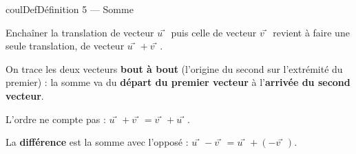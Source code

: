 \documentclass[11pt,a4paper]{article}
\makeatletter
\newcounter{lycee@signet}
\newcommand{\signet}[3][]{\stepcounter{lycee@signet}%
  \edef\lycee@dest{\if\relax\detokenize{#1}\relax
    signet.\arabic{lycee@signet}\else#1\fi}%
  \hypertarget{\lycee@dest}{}\bookmark[level=#2,dest=\lycee@dest]{#3}}
\def\vec#1{#1⃗}}%
\newenvironment{definitionbox}[1][Définition]%
  {\begin{boitecours}[phantom={\signet{2}{#1}}]{coulDef}{#1}}{\end{boitecours}}
\makeatother
\begin{document}
\begin{definitionbox}[Définition 5 --- Somme]
\begin{minipage}[t]{0.58\linewidth}\raggedright
Enchaîner la translation de vecteur $\vec{u}$ puis celle de vecteur $\vec{v}$ revient à
faire une seule translation, de vecteur $\vec{u}+\vec{v}$.

\smallskip
On trace les deux vecteurs \textbf{bout à bout} (l'origine du second sur l'extrémité du
premier) : la somme va du \textbf{départ du premier vecteur} à l'\textbf{arrivée du second
vecteur}.

\smallskip
L'ordre ne compte pas : $\vec{u}+\vec{v}=\vec{v}+\vec{u}$.

\smallskip
La \textbf{différence} est la somme avec l'opposé : $\vec{u}-\vec{v}=\vec{u}+(-\vec{v})$.
\end{minipage}\hfill
\begin{minipage}[t]{0.38\linewidth}
\vspace{0pt}\centering
{}
\end{minipage}
\end{definitionbox}
\end{document}
